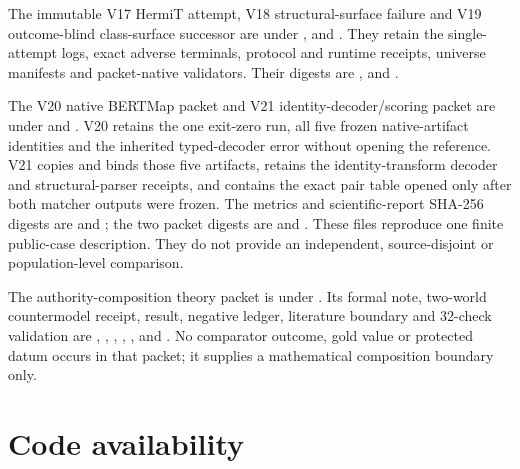 The immutable V17 HermiT attempt, V18 structural-surface failure and V19
outcome-blind class-surface successor are under
,
 and
. They retain the
single-attempt logs, exact adverse terminals, protocol and runtime receipts,
universe manifests and packet-native validators. Their 
digests are
,
and
.

The V20 native BERTMap packet and V21 identity-decoder/scoring packet are under
 and
.
V20 retains the one exit-zero run, all five frozen native-artifact identities
and the inherited typed-decoder error without opening the reference. V21 copies
and binds those five artifacts, retains the identity-transform decoder and
structural-parser receipts, and contains the exact pair table opened only after
both matcher outputs were frozen. The metrics and scientific-report SHA-256
digests are
and
;
the two packet  digests are
and
.
These files reproduce one finite public-case description. They do not provide
an independent, source-disjoint or population-level comparison.

The authority-composition theory packet is under
. Its formal
note, two-world countermodel receipt, result, negative ledger, literature
boundary and 32-check validation are
,
, ,
, , and
. No comparator outcome, gold value or
protected datum occurs in that packet; it supplies a mathematical composition
boundary only.

\section{Code availability}

